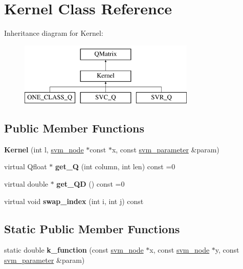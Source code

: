 \hypertarget{class_kernel}{
\section{Kernel Class Reference}
\label{class_kernel}
}
Inheritance diagram for Kernel:\begin{figure}[H]
\begin{center}
\leavevmode
\includegraphics[height=3cm]{class_kernel}
\end{center}
\end{figure}
\subsection*{Public Member Functions}
\begin{DoxyCompactItemize}
\item 
\hypertarget{class_kernel_a25ffaa0c67cc5b8c7fcdb6f97ca1725f}{
{\bfseries Kernel} (int l, \hyperlink{structsvm__node}{svm\_\-node} $\ast$const $\ast$x, const \hyperlink{structsvm__parameter}{svm\_\-parameter} \&param)}
\label{class_kernel_a25ffaa0c67cc5b8c7fcdb6f97ca1725f}

\item 
\hypertarget{class_kernel_a30483355cbb8b5ab4e4c7a93bcef7429}{
virtual Qfloat $\ast$ {\bfseries get\_\-Q} (int column, int len) const =0}
\label{class_kernel_a30483355cbb8b5ab4e4c7a93bcef7429}

\item 
\hypertarget{class_kernel_a5b7fde9af9d10f7b8f7105eb85bf3d5b}{
virtual double $\ast$ {\bfseries get\_\-QD} () const =0}
\label{class_kernel_a5b7fde9af9d10f7b8f7105eb85bf3d5b}

\item 
\hypertarget{class_kernel_adca807c5584bc42fd098cd9eb1f19621}{
virtual void {\bfseries swap\_\-index} (int i, int j) const }
\label{class_kernel_adca807c5584bc42fd098cd9eb1f19621}

\end{DoxyCompactItemize}
\subsection*{Static Public Member Functions}
\begin{DoxyCompactItemize}
\item 
\hypertarget{class_kernel_a6ff0d4ac64bf7fba29d2ca3433dd5127}{
static double {\bfseries k\_\-function} (const \hyperlink{structsvm__node}{svm\_\-node} $\ast$x, const \hyperlink{structsvm__node}{svm\_\-node} $\ast$y, const \hyperlink{structsvm__parameter}{svm\_\-parameter} \&param)}
\label{class_kernel_a6ff0d4ac64bf7fba29d2ca3433dd5127}

\end{DoxyCompactItemize}
